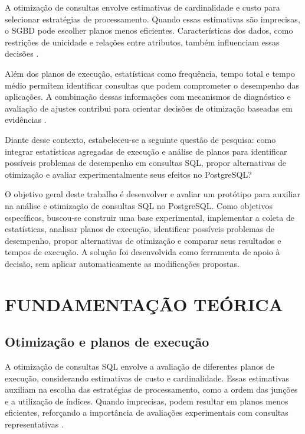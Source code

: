 \documentclass{UNESC}
\begin{document}
A otimização de consultas envolve estimativas de cardinalidade e custo para selecionar estratégias de processamento. Quando essas estimativas são imprecisas, o SGBD pode escolher planos menos eficientes. Características dos dados, como restrições de unicidade e relações entre atributos, também influenciam essas decisões \cite{lan2021optimizer,kossmann2022dependencies}.

Além dos planos de execução, estatísticas como frequência, tempo total e tempo médio permitem identificar consultas que podem comprometer o desempenho das aplicações. A combinação dessas informações com mecanismos de diagnóstico e avaliação de ajustes contribui para orientar decisões de otimização baseadas em evidências \cite{postgresql2026pgstat,huang2023}.

Diante desse contexto, estabeleceu-se a seguinte questão de pesquisa: como integrar estatísticas agregadas de execução e análise de planos para identificar possíveis problemas de desempenho em consultas SQL, propor alternativas de otimização e avaliar experimentalmente seus efeitos no PostgreSQL?

O objetivo geral deste trabalho é desenvolver e avaliar um protótipo para auxiliar na análise e otimização de consultas SQL no PostgreSQL. Como objetivos específicos, buscou-se construir uma base experimental, implementar a coleta de estatísticas, analisar planos de execução, identificar possíveis problemas de desempenho, propor alternativas de otimização e comparar seus resultados e tempos de execução. A solução foi desenvolvida como ferramenta de apoio à decisão, sem aplicar automaticamente as modificações propostas.



\section{FUNDAMENTAÇÃO TEÓRICA}

\subsection{Otimização e planos de execução}

A otimização de consultas SQL envolve a avaliação de diferentes planos de execução, considerando estimativas de custo e cardinalidade. Essas estimativas auxiliam na escolha das estratégias de processamento, como a ordem das junções e a utilização de índices. Quando imprecisas, podem resultar em planos menos eficientes, reforçando a importância de avaliações experimentais com consultas representativas \cite{lan2021optimizer,leis2025optimizers}.
\end{document}

